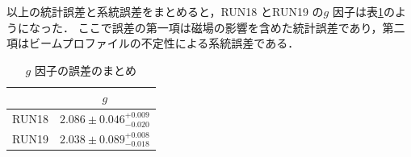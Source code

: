 以上の統計誤差と系統誤差をまとめると，RUN18 とRUN19 の$g$ 因子は表\ref{tab:NaIggosamatome}のようになった．
ここで誤差の第一項は磁場の影響を含めた統計誤差であり，第二項はビームプロファイルの不定性による系統誤差である．

\begin{table}[H]%
\caption{$g$ 因子の誤差のまとめ}
\centering
\begingroup
\renewcommand{\arraystretch}{1.2}%
\begin{tabular}{cc}\toprule
{} &   $g$  \\ \midrule
RUN18 & $2.086 \pm 0.046^{+0.009}_{-0.020} $  \\
RUN19 & $2.038 \pm 0.089^{+0.008}_{-0.018} $  \\ \bottomrule
\end{tabular}\label{tab:NaIggosamatome}
\endgroup
\end{table}

%
